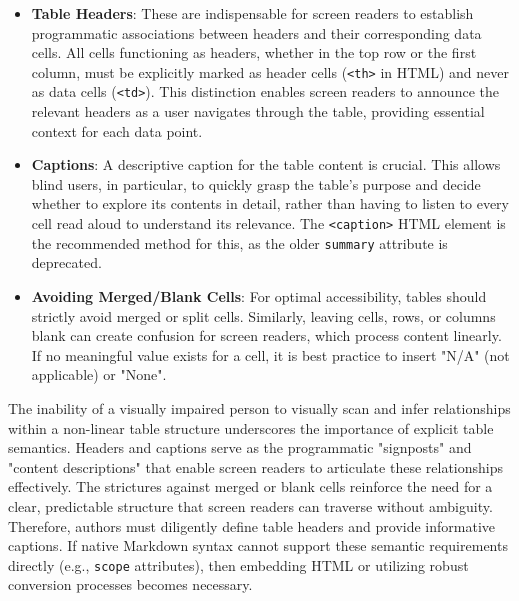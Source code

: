 \begin{itemize}
    \item \textbf{Table Headers}: These are indispensable for screen readers to establish programmatic associations between headers and their corresponding data cells. \cite{MDNTableAccess,OSUDigitalAccess,DSU} All cells functioning as headers, whether in the top row or the first column, must be explicitly marked as header cells (\texttt{<th>} in HTML) and never as data cells (\texttt{<td>}). \cite{MDNTableAccess,OSUDigitalAccess} This distinction enables screen readers to announce the relevant headers as a user navigates through the table, providing essential context for each data point. \cite{MDNTableAccess,OSUDigitalAccess}
    \item \textbf{Captions}: A descriptive caption for the table content is crucial. \cite{MDNTableAccess} This allows blind users, in particular, to quickly grasp the table's purpose and decide whether to explore its contents in detail, rather than having to listen to every cell read aloud to understand its relevance. \cite{MDNTableAccess} The \texttt{<caption>} HTML element is the recommended method for this, as the older \texttt{summary} attribute is deprecated. \cite{MDNTableAccess}
    \item \textbf{Avoiding Merged/Blank Cells}: For optimal accessibility, tables should strictly avoid merged or split cells. \cite{DSU} Similarly, leaving cells, rows, or columns blank can create confusion for screen readers, which process content linearly. \cite{DSU,MDNTableAccess} If no meaningful value exists for a cell, it is best practice to insert "N/A" (not applicable) or "None". \cite{DSU,GitLabDocs}
\end{itemize}

The inability of a visually impaired person to visually scan and infer relationships within a non-linear table structure underscores the importance of explicit table semantics. Headers and captions serve as the programmatic "signposts" and "content descriptions" that enable screen readers to articulate these relationships effectively. The strictures against merged or blank cells reinforce the need for a clear, predictable structure that screen readers can traverse without ambiguity. Therefore, authors must diligently define table headers and provide informative captions. If native Markdown syntax cannot support these semantic requirements directly (e.g., \texttt{scope} attributes), then embedding HTML or utilizing robust conversion processes becomes necessary.

